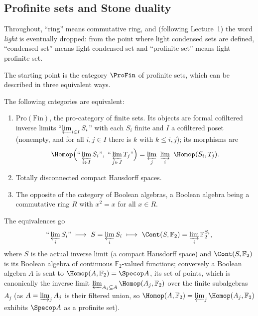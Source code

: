\subsection{Profinite sets and Stone duality}

\begin{notation}
\label{not:2:light-drop}
Throughout, ``ring'' means commutative ring, and (following Lecture~1) the word
\emph{light} is eventually dropped: from the point where light condensed sets are
defined, ``condensed set'' means light condensed set and ``profinite set'' means
light profinite set.
\end{notation}

The starting point is the category $\ProFin$ of profinite sets, which can be
described in three equivalent ways.

\begin{proposition}
\label{prop:2:stone-duality}
The following categories are equivalent:
\begin{enumerate}
\item $\mathrm{Pro}(\mathrm{Fin})$, the pro-category of finite sets. Its objects
are formal cofiltered inverse limits ``$\varprojlim_{i\in I} S_i$'' with each
$S_i$ finite and $I$ a cofiltered poset (nonempty, and for all $i,j\in I$ there is
$k$ with $k\le i,j$); its morphisms are
\begin{equation*}
\Homop\Bigl(\text{``}\varprojlim_{i\in I} S_i\text{''},\
\text{``}\varprojlim_{j\in J} T_j\text{''}\Bigr)
=\varprojlim_{j}\ \varinjlim_{i}\ \Homop(S_i,T_j).
\end{equation*}
\item Totally disconnected compact Hausdorff spaces.
\item The opposite of the category of Boolean algebras, a Boolean algebra being a
commutative ring $R$ with $x^2=x$ for all $x\in R$.
\end{enumerate}
The equivalences go
\[
\text{``}\varprojlim_i S_i\text{''}\ \longmapsto\
S=\varprojlim_i S_i\ \longmapsto\
\Cont(S,\mathbb{F}_2)=\varinjlim_i \mathbb{F}_2^{S_i},
\]
where $S$ is the actual inverse limit (a compact Hausdorff space) and
$\Cont(S,\mathbb{F}_2)$ is its Boolean algebra of continuous
$\mathbb{F}_2$-valued functions; conversely a Boolean algebra $A$ is sent to
$\Homop(A,\mathbb{F}_2)=\Specop A$, its set of points, which is canonically the
inverse limit $\varprojlim_{A_j\subseteq A} \Homop(A_j,\mathbb{F}_2)$ over the
finite subalgebras $A_j$ (as $A=\varinjlim_j A_j$ is their filtered union, so
$\Homop(A,\mathbb{F}_2)=\varprojlim_j\Homop(A_j,\mathbb{F}_2)$ exhibits $\Specop A$
as a profinite set).
\end{proposition}

